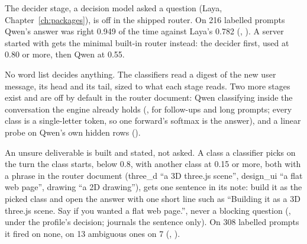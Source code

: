 The decider stage, a decision model asked a  question (Laya, Chapter~\ref{ch:packages}), is off in the shipped router. On 216 labelled prompts Qwen's answer was right 0.949 of the time against Laya's 0.782 (\measured, ). A server started with  gets the minimal built-in router instead: the decider first, used at 0.80 or more, then Qwen at 0.55.

No word list decides anything. The classifiers read a digest of the new user message, its head and its tail, sized to what each stage reads. Two more stages exist and are off by default in the router document: Qwen classifying inside the conversation the engine already holds (, for follow-ups and long prompts; every class is a single-letter token, so one forward's softmax is the answer), and a linear probe on Qwen's own hidden rows ().

An unsure deliverable is built and stated, not asked. A class a classifier picks on the turn the class starts, below 0.8, with another class at 0.15 or more, both with a  phrase in the router document (three\_d ``a 3D three.js scene'', design\_ui ``a flat web page'', drawing ``a 2D drawing''), gets one sentence in its note: build it as the picked class and open the answer with one short line such as ``Building it as a 3D three.js scene. Say if you wanted a flat web page.'', never a blocking question (, under the profile's  decision;  journals the sentence only). On 308 labelled prompts it fired on none, on 13 ambiguous ones on 7 (\measured, ).

